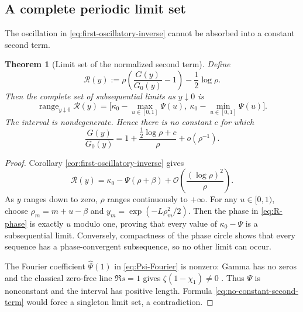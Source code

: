 \documentclass[11pt,oneside]{article}
\numberwithin{equation}{section}
\newtheorem{theorem}{Theorem}[section]
\theoremstyle{definition}
\theoremstyle{remark}
\newcommand{\bigO}{\mathcal O}
\newcommand{\smallo}{o}
\newcommand{\range}{\operatorname{range}}
\begin{document}
\subsection{A complete periodic limit set}

The oscillation in \eqref{eq:first-oscillatory-inverse} cannot be absorbed into a
constant second term.

\begin{theorem}[Limit set of the normalized second term]
\label{thm:inverse-limit-set}
Define
\begin{equation}
 \mathscr R(y):=
 \rho\left(\frac{G(y)}{G_0(y)}-1\right)-\frac12\log\rho.
 \label{eq:R-limit-set}
\end{equation}
Then the complete set of subsequential limits as $y\downarrow0$ is
\begin{equation}
 \boxed{
 \range_{y\downarrow0}\mathscr R(y)
 =\bigl[\kappa_0-\max_{u\in[0,1]}\Psi(u),
         \ \kappa_0-\min_{u\in[0,1]}\Psi(u)\bigr].}
 \label{eq:inverse-limit-interval}
\end{equation}
The interval is nondegenerate.  Hence there is no constant $c$ for which
\begin{equation}
 \frac{G(y)}{G_0(y)}
 =1+\frac{\tfrac12\log\rho+c}{\rho}+\smallo(\rho^{-1}).
 \label{eq:no-constant-second-term}
\end{equation}
\end{theorem}

\begin{proof}
Corollary \ref{cor:first-oscillatory-inverse} gives
\begin{equation}
 \mathscr R(y)=\kappa_0-\Psi(\rho+\beta)
 +\bigO\!\left(\frac{(\log\rho)^2}{\rho}\right).
 \label{eq:R-phase}
\end{equation}
As $y$ ranges down to zero, $\rho$ ranges continuously to $+\infty$.  For any
$u\in[0,1)$, choose $\rho_m=m+u-\beta$ and
$y_m=\exp(-L\rho_m^2/2)$.  Then the phase in \eqref{eq:R-phase} is exactly
$u$ modulo one, proving that every value of $\kappa_0-\Psi$ is a subsequential
limit.  Conversely, compactness of the phase circle shows that every sequence has a
phase-convergent subsequence, so no other limit can occur.

The Fourier coefficient $\widehat\Psi(1)$ in \eqref{eq:Psi-Fourier} is nonzero:
Gamma has no zeros and the classical zero-free line $\Re s=1$ gives
$\zeta(1-\chi_1)\ne0$ \cite{TitchmarshZeta}.  Thus $\Psi$ is nonconstant and the interval has positive
length.  Formula \eqref{eq:no-constant-second-term} would force a singleton limit set,
a contradiction.
\end{proof}
\end{document}
